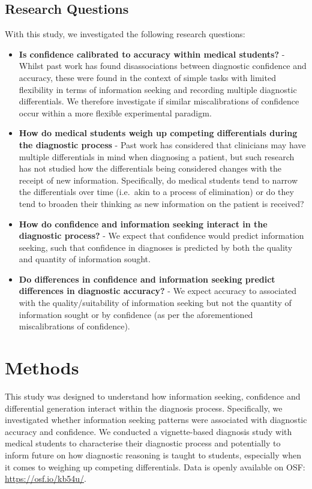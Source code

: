 \documentclass[a4paper, nobind]{templates/ociamthesis}
\providecommand{\tightlist}{%
  \setlength{\itemsep}{0pt}\setlength{\parskip}{0pt}}
\begin{document}
\subsection{Research Questions}\label{research-questions}

With this study, we investigated the following research questions:

\begin{itemize}
\tightlist
\item
  \textbf{Is confidence calibrated to accuracy within medical students?} - Whilst past work has found disassociations between diagnostic confidence and accuracy, these were found in the context of simple tasks with limited flexibility in terms of information seeking and recording multiple diagnostic differentials. We therefore investigate if similar miscalibrations of confidence occur within a more flexible experimental paradigm.
\item
  \textbf{How do medical students weigh up competing differentials during the diagnostic process} - Past work has considered that clinicians may have multiple differentials in mind when diagnosing a patient, but such research has not studied how the differentials being considered changes with the receipt of new information. Specifically, do medical students tend to narrow the differentials over time (i.e.~akin to a process of elimination) or do they tend to broaden their thinking as new information on the patient is received?
\item
  \textbf{How do confidence and information seeking interact in the diagnostic process?} - We expect that confidence would predict information seeking, such that confidence in diagnoses is predicted by both the quality and quantity of information sought.
\item
  \textbf{Do differences in confidence and information seeking predict differences in diagnostic accuracy?} - We expect accuracy to associated with the quality/suitability of information seeking but not the quantity of information sought or by confidence (as per the aforementioned miscalibrations of confidence).
\end{itemize}

\section{Methods}\label{methods-1}

This study was designed to understand how information seeking, confidence and differential generation interact within the diagnosis process. Specifically, we investigated whether information seeking patterns were associated with diagnostic accuracy and confidence. We conducted a vignette-based diagnosis study with medical students to characterise their diagnostic process and potentially to inform future on how diagnostic reasoning is taught to students, especially when it comes to weighing up competing differentials. Data is openly available on OSF: \url{https://osf.io/kb54u/}.
\end{document}
